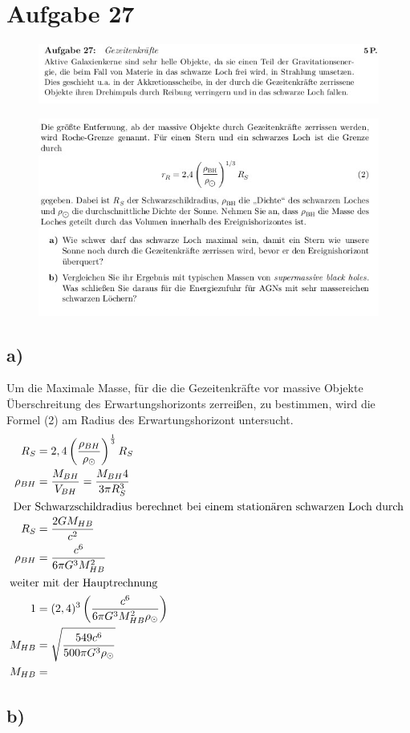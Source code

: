 \section{Aufgabe 27}
\begin{figure}[H]
    \centering
    \includegraphics[width=\textwidth]{images/ex27_1.jpg}
\end{figure}
\begin{figure}[H]
    \centering
    \includegraphics[width=\textwidth]{images/ex27_2.jpg}
\end{figure}



\subsection{a)}
Um die Maximale Masse, für die die Gezeitenkräfte vor massive Objekte Überschreitung des Erwartungshorizonts
zerreißen, zu bestimmen, wird die Formel (2) am Radius des Erwartungshorizont untersucht.
\begin{align}
    R_S &= 2,4 \left( \frac{\rho _{BH}}{\rho _{\odot}} \right)^{\frac{1}{3}} R_S \\
    \rho _{BH} &= \frac{M_{BH}}{V_{BH}} = \frac{M_{BH}4}{3 \pi R_S^3}\\
    \intertext{
        Der Schwarzschildradius berechnet bei einem stationären schwarzen Loch durch
    }
    R_S &= \frac{2GM_{HB}}{c^2}\\
    \rho_{BH} &= \frac{ c^6}{6 \pi G^3 M_{HB}^2} \\
    \intertext{weiter mit der Hauptrechnung}
    1 &= (2,4)^3 \left( \frac{c^6}{6 \pi G^3 M_{HB}^2 \rho _{\odot}} \right)\\
    M_{HB} &= \sqrt{ \frac{549 c^6}{500 \pi G^3 \rho _{\odot} } }\\
    M_{HB} &= \text{}
\end{align}


\subsection{b)}








